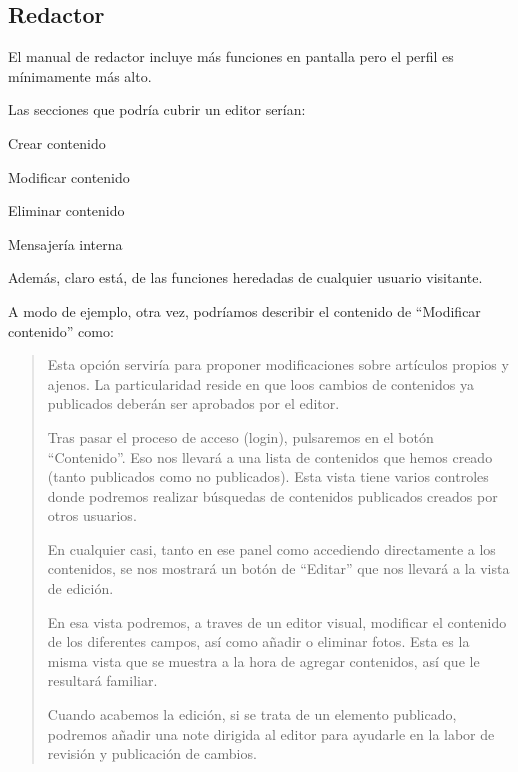 \subsection{Redactor}
\par El manual de redactor incluye más funciones en pantalla pero el perfil es mínimamente más alto.
\par Las secciones que podría cubrir un editor serían:
\begin{center}
 \begin{description}
  \item Crear contenido
  \item Modificar contenido
  \item Eliminar contenido
  \item Mensajería interna
  \end{description}
\end{center}
\par Además, claro está, de las funciones heredadas de cualquier usuario visitante.
\par A modo de ejemplo, otra vez, podríamos describir el contenido de ``Modificar contenido'' como:
\begin{quotation}
\par Esta opción serviría para proponer modificaciones sobre artículos propios y ajenos. La particularidad reside en que loos cambios de contenidos ya publicados deberán ser aprobados por el editor.
\par Tras pasar el proceso de acceso (login), pulsaremos en el botón ``Contenido''. Eso nos llevará a una lista de contenidos que hemos creado (tanto publicados como no publicados). Esta vista tiene varios controles donde podremos realizar búsquedas de contenidos publicados creados por otros usuarios.
\par En cualquier casi, tanto en ese panel como accediendo directamente a los contenidos, se nos mostrará un botón de ``Editar'' que nos llevará a la vista de edición.
\par En esa vista podremos, a traves de un editor visual, modificar el contenido de los diferentes campos, así como añadir o eliminar fotos. Esta es la misma vista que se muestra a la hora de agregar contenidos, así que le resultará familiar.
\par Cuando acabemos la edición, si se trata de un elemento publicado, podremos añadir una note dirigida al editor para ayudarle en la labor de revisión y publicación de cambios.
\end{quotation}


